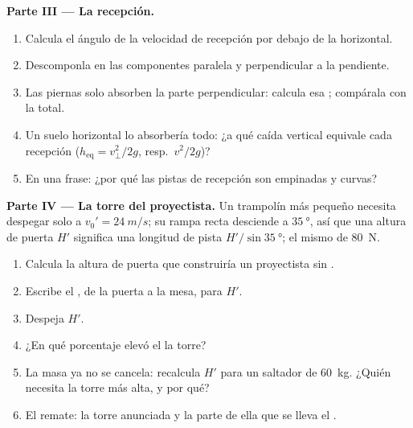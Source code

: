 \begin{problem}
\medskip\noindent\textbf{Parte III --- La recepción.}
\begin{enumerate}[resume]
  \item Calcula el ángulo de la velocidad de recepción por debajo de la horizontal.
  \item Descomponla en las componentes paralela y perpendicular a la pendiente.
  \item Las piernas solo absorben la parte perpendicular: calcula esa ; compárala con la total.
  \item Un suelo horizontal lo absorbería todo: ¿a qué caída vertical equivale cada
        recepción ($h_{\text{eq}} = v_\perp^2/2g$, resp.\ $v^2/2g$)?
  \item En una frase: ¿por qué las pistas de recepción son empinadas y curvas?
\end{enumerate}

\medskip\noindent\textbf{Parte IV --- La torre del proyectista.}
Un trampolín más pequeño necesita despegar solo a $v_0' = \qty{24}{m/s}$; su rampa
recta desciende a $\qty{35}{\degree}$, así que una altura de puerta $H'$ significa una
longitud de pista $H'/\sin\qty{35}{\degree}$; el mismo  de \qty{80}{N}.
\begin{enumerate}[resume]
  \item Calcula la altura de puerta que construiría un proyectista sin .
  \item Escribe el , de la puerta a la mesa, para $H'$.
  \item Despeja $H'$.
  \item ¿En qué porcentaje elevó el  la torre?
  \item La masa ya no se cancela: recalcula $H'$ para un saltador de \qty{60}{kg}.
        ¿Quién necesita la torre más alta, y por qué?
  \item El remate: la torre anunciada y la parte de ella que se lleva el .
\end{enumerate}
\end{problem}
